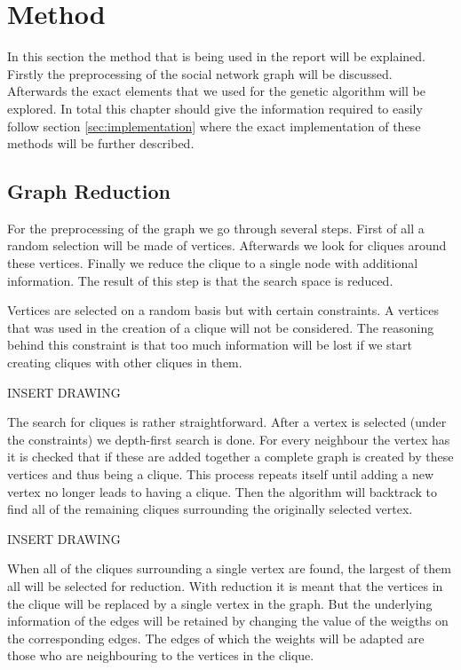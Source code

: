 \section{Method}
\label{sec:method}
In this section the method that is being used in the report will be explained.
Firstly the preprocessing of the social network graph will be discussed.
Afterwards the exact elements that we used for the genetic algorithm will be explored.
In total this chapter should give the information required to easily follow section \ref{sec:implementation} where the exact implementation of these methods will be further described.

\subsection{Graph Reduction}
For the preprocessing of the graph we go through several steps.
First of all a random selection will be made of vertices.
Afterwards we look for cliques around these vertices.
Finally we reduce the clique to a single node with additional information.
The result of this step is that the search space is reduced.

Vertices are selected on a random basis but with certain constraints.
A vertices that was used in the creation of a clique will not be considered.
The reasoning behind this constraint is that too much information will be lost if we start creating cliques with other cliques in them.

INSERT DRAWING

The search for cliques is rather straightforward.
After a vertex is selected (under the constraints) we depth-first search is done.
For every neighbour the vertex has it is checked that if these are added together a complete graph is created by these vertices and thus being a clique.
This process repeats itself until adding a new vertex no longer leads to having a clique.
Then the algorithm will backtrack to find all of the remaining cliques surrounding the originally selected vertex.

INSERT DRAWING

When all of the cliques surrounding a single vertex are found, the largest of them all will be selected for reduction.
With reduction it is meant that the vertices in the clique will be replaced by a single vertex in the graph.
But the underlying information of the edges will be retained by changing the value of the weigths on the corresponding edges.
The edges of which the weights will be adapted are those who are neighbouring to the vertices in the clique.

